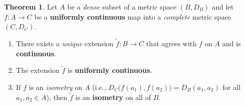 \documentclass[12pt]{article}
\theoremstyle{definition} %
\newtheorem{theorem}{Theorem}
\theoremstyle{plain} %
\begin{document}
\begin{theorem}\label{thm:uc_extension}
  Let $A$ be a \emph{dense} subset of a metric space $(B,D_B)$ and let
  $f:A\to C$ be a \textbf{uniformly continuous} map into a \emph{complete}
  metric space $(C,D_C)$.
  \begin{enumerate}[label=\textup{(\alph*)}]
    \item There exists a \emph{unique} extension
          $\tilde f : B \to C$ that agrees with $f$ on $A$ and is
          \textbf{continuous}.
    \item The extension $\tilde f$ is \textbf{uniformly continuous}.
    \item If $f$ is an \emph{isometry} on $A$
      (i.e., $D_C\bigl(f(a_1),f(a_2)\bigr)=D_B(a_1,a_2)$ for all
      $a_1,a_2\in A$), then $\tilde f$ is an \textbf{isometry}
      on all of $B$.
\end{enumerate}
\end{theorem}
\end{document}
